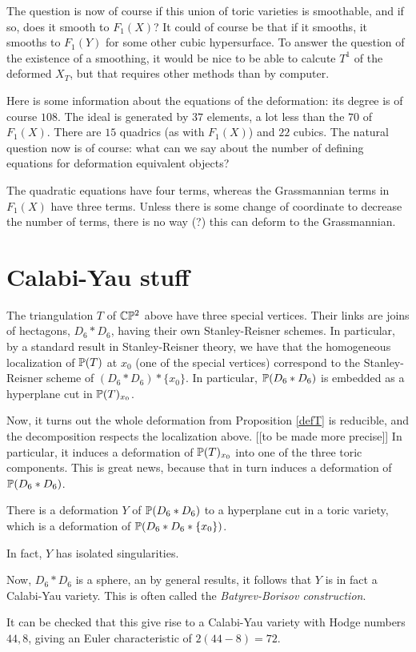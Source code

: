 \documentclass[11pt, english]{article}
\begin{document}
The question is now of course if this union of toric varieties is smoothable, and if so, does it smooth to $F_1(X)$? It could of course be that if it smooths, it smooths to $F_1(Y)$ for some other cubic hypersurface. To answer the question of the existence of a smoothing, it would be nice to be able to calcute $T^1$ of the deformed $X_T$, but that requires other methods than by computer. 

Here is some information about the equations of the deformation: its degree is of course $108$. The ideal is generated by $37$ elements, a lot less than the $70$ of $F_1(X)$. There are $15$ quadrics (as with $F_1(X)$) and $22$ cubics. The natural question now is of course: what can we say about the number of defining equations for deformation equivalent objects?

\begin{remark}
 The quadratic equations have four terms, whereas the Grassmannian terms in $F_1(X)$ have three terms. Unless there is some change of coordinate to decrease the number of terms, there is no way (?) this can deform to the Grassmannian.
\end{remark}

\section{Calabi-Yau stuff}

The triangulation $T$ of $\mathbb{C} \mathbb{P}^2$ above  have three special vertices. Their links are joins of hectagons, $D_6 \ast D_6$, having their own Stanley-Reisner schemes. In particular, by a standard result in Stanley-Reisner theory, we have that the homogeneous localization of $\mathbb{P}(T)$ at $x_0$ (one of the special vertices) correspond to the Stanley-Reisner scheme of $(D_6 \ast D_6) \ast \{ x_0 \}$. In particular, $\mathbb{P}(D_6 \ast D_6)$ is embedded as a hyperplane cut in $\mathbb{P}(T)_{x_0}$. 

Now, it turns out the whole deformation from Proposition \ref{defT} is reducible, and the decomposition respects the localization above. [[to be made more precise]] In particular, it induces a deformation of $\mathbb{P}(T)_{x_0}$ into one of the three toric components. This is great news, because that in turn induces a deformation of $\mathbb{P}(D_6 \ast D_6)$.

\begin{lemma}
There is a deformation $Y$ of $\mathbb{P}(D_6 \ast D_6)$ to a hyperplane cut in a toric variety, which is a deformation of $\mathbb{P}(D_6 \ast D_6 \ast \{x_0 \})$.

In fact, $Y$ has isolated singularities.  
\end{lemma}

Now, $D_6 \ast D_6$ is a sphere, an by general results, it follows that $Y$ is in fact a Calabi-Yau variety. This is often called the \emph{Batyrev-Borisov construction}.

It can be checked that this give rise to a Calabi-Yau variety with Hodge numbers $44,8$, giving an Euler characteristic of $2(44-8)=72$. 


 
\end{document}
